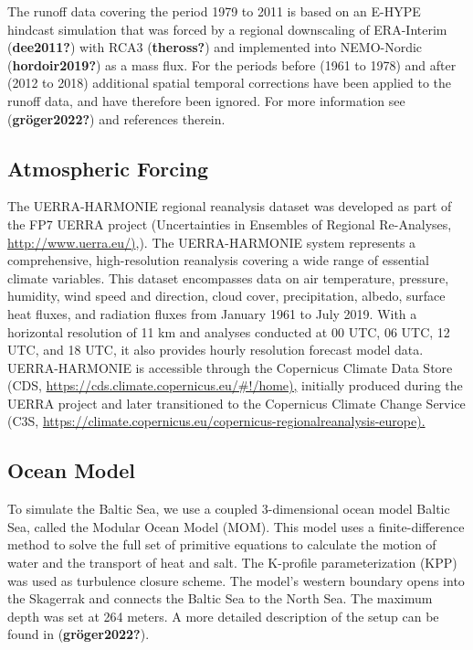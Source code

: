 \documentclass[
]{agujournal2019}
\begin{document}
The runoff data covering the period 1979 to 2011 is based on an E-HYPE
hindcast simulation that was forced by a regional downscaling of
ERA-Interim (\textbf{dee2011?}) with RCA3 (\textbf{theross?}) and
implemented into NEMO-Nordic (\textbf{hordoir2019?}) as a mass flux. For
the periods before (1961 to 1978) and after (2012 to 2018) additional
spatial temporal corrections have been applied to the runoff data, and
have therefore been ignored. For more information see
(\textbf{gröger2022?}) and references therein.

\hypertarget{atmospheric-forcing}{%
\subsection{Atmospheric Forcing}\label{atmospheric-forcing}}

The UERRA-HARMONIE regional reanalysis dataset was developed as part of
the FP7 UERRA project (Uncertainties in Ensembles of Regional
Re-Analyses, \href{http://www.uerra.eu/}{http://www.uerra.eu/)},). The
UERRA-HARMONIE system represents a comprehensive, high-resolution
reanalysis covering a wide range of essential climate variables. This
dataset encompasses data on air temperature, pressure, humidity, wind
speed and direction, cloud cover, precipitation, albedo, surface heat
fluxes, and radiation fluxes from January 1961 to July 2019. With a
horizontal resolution of 11 km and analyses conducted at 00 UTC, 06 UTC,
12 UTC, and 18 UTC, it also provides hourly resolution forecast model
data. UERRA-HARMONIE is accessible through the Copernicus Climate Data
Store (CDS, \url{https://cds.climate.copernicus.eu/\#!/home),} initially
produced during the UERRA project and later transitioned to the
Copernicus Climate Change Service (C3S,
\url{https://climate.copernicus.eu/copernicus-regionalreanalysis-europe).}

\hypertarget{ocean-model}{%
\subsection{Ocean Model}\label{ocean-model}}

To simulate the Baltic Sea, we use a coupled 3-dimensional ocean model
Baltic Sea, called the Modular Ocean Model (MOM). This model uses a
finite-difference method to solve the full set of primitive equations to
calculate the motion of water and the transport of heat and salt. The
K-profile parameterization (KPP) was used as turbulence closure scheme.
The model's western boundary opens into the Skagerrak and connects the
Baltic Sea to the North Sea. The maximum depth was set at 264 meters. A
more detailed description of the setup can be found in
(\textbf{gröger2022?}).
\end{document}
